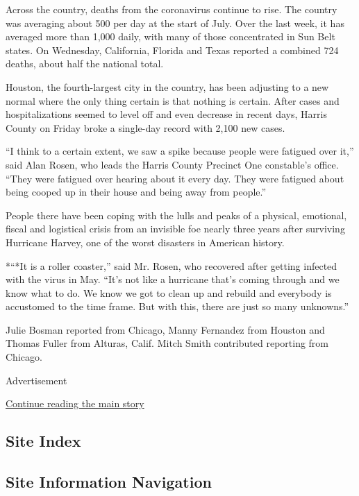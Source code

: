 Across the country, deaths from the coronavirus continue to rise. The
country was averaging about 500 per day at the start of July. Over the
last week, it has averaged more than 1,000 daily, with many of those
concentrated in Sun Belt states. On Wednesday, California, Florida and
Texas reported a combined 724 deaths, about half the national total.

Houston, the fourth-largest city in the country, has been adjusting to a
new normal where the only thing certain is that nothing is certain.
After cases and hospitalizations seemed to level off and even decrease
in recent days, Harris County on Friday broke a single-day record with
2,100 new cases.

``I think to a certain extent, we saw a spike because people were
fatigued over it,'' said Alan Rosen, who leads the Harris County
Precinct One constable's office. ``They were fatigued over hearing about
it every day. They were fatigued about being cooped up in their house
and being away from people.''

People there have been coping with the lulls and peaks of a physical,
emotional, fiscal and logistical crisis from an invisible foe nearly
three years after surviving Hurricane Harvey, one of the worst disasters
in American history.

*``*It is a roller coaster,'' said Mr. Rosen, who recovered after
getting infected with the virus in May. ``It's not like a hurricane
that's coming through and we know what to do. We know we got to clean up
and rebuild and everybody is accustomed to the time frame. But with
this, there are just so many unknowns.''

Julie Bosman reported from Chicago, Manny Fernandez from Houston and
Thomas Fuller from Alturas, Calif. Mitch Smith contributed reporting
from Chicago.

Advertisement

\protect\hyperlink{after-bottom}{Continue reading the main story}

\hypertarget{site-index}{%
\subsection{Site Index}\label{site-index}}

\hypertarget{site-information-navigation}{%
\subsection{Site Information
Navigation}\label{site-information-navigation}}

